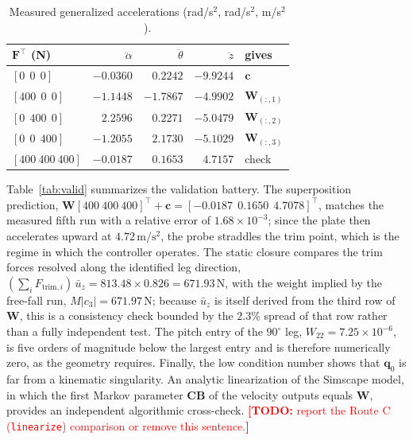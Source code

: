 \documentclass[]{IAC_style}
\newcommand{\todo}[1]{\textcolor{red}{\textbf{[TODO:} #1\textbf{]}}}
\newcommand{\W}{\bm{W}}
\newcommand{\Bmat}{\bm{B}}
\newcommand{\Cmat}{\bm{C}}
\newcommand{\qv}{\bm{q}}
\newcommand{\Fv}{\bm{F}}
\newcommand{\cv}{\bm{c}}
\newcommand{\un}[1]{\,\mathrm{#1}}
\begin{document}
\begin{table}[H]
\centering
\caption{Measured generalized accelerations (rad/s$^2$, rad/s$^2$, m/s$^2$).}
\label{tab:accs}
\footnotesize
\begin{tabular}{@{}lrrrl@{}}
\toprule
$\Fv^\top$ (N) & $\ddot\alpha$ & $\ddot\theta$ & $\ddot z$ & gives\\
\midrule
$[0\ \ 0\ \ 0]$       & $-0.0360$ & $0.2242$  & $-9.9244$ & $\cv$\\
$[400\ \ 0\ \ 0]$     & $-1.1448$ & $-1.7867$ & $-4.9902$ & $\W_{(:,1)}$\\
$[0\ \ 400\ \ 0]$     & $2.2596$  & $0.2271$  & $-5.0479$ & $\W_{(:,2)}$\\
$[0\ \ 0\ \ 400]$     & $-1.2055$ & $2.1730$  & $-5.1029$ & $\W_{(:,3)}$\\
\midrule
$[400\ 400\ 400]$     & $-0.0187$ & $0.1653$  & $4.7157$  & check\\
\bottomrule
\end{tabular}
\end{table}

Table~\ref{tab:valid} summarizes the validation battery. The superposition prediction, $\W[400\ 400\ 400]^\top+\cv=[-0.0187\ \ 0.1650\ \ 4.7078]^\top$, matches the measured fifth run with a relative error of $1.68\times10^{-3}$; since the plate then accelerates upward at $4.72\un{m/s^2}$, the probe straddles the trim point, which is the regime in which the controller operates. The static closure compares the trim forces resolved along the identified leg direction, $(\sum_iF_{\mathrm{trim},i})\,\bar u_z=813.48\times0.826=671.93\un{N}$, with the weight implied by the free-fall run, $M|c_3|=671.97\un{N}$; because $\bar u_z$ is itself derived from the third row of $\W$, this is a consistency check bounded by the $2.3\%$ spread of that row rather than a fully independent test. The pitch entry of the $90^\circ$ leg, $W_{22}=7.25\times10^{-6}$, is five orders of magnitude below the largest entry and is therefore numerically zero, as the geometry requires. Finally, the low condition number shows that $\qv_0$ is far from a kinematic singularity. An analytic linearization of the Simscape model, in which the first Markov parameter $\Cmat\Bmat$ of the velocity outputs equals $\W$, provides an independent algorithmic cross-check. \todo{report the Route C (\texttt{linearize}) comparison or remove this sentence.}
\end{document}
